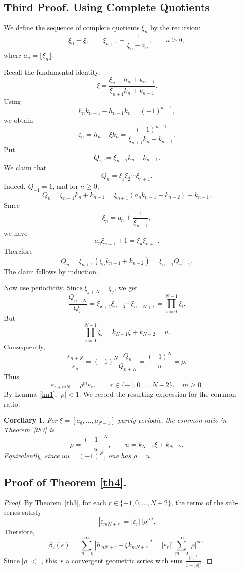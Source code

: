 \documentclass[]{interact}
\theoremstyle{plain}
\numberwithin{equation}{section} %
\newtheorem{corollary}[thm]{Corollary}
\numberwithin{table}{section} %
\numberwithin{figure}{section}
\begin{document}
\subsection{Third Proof. Using Complete Quotients}

We define the sequence of complete quotients $\xi_n$ by the recursion:
$$
\xi_0 = \xi, \qquad
\xi_{n+1} = \frac{1}{\xi_n - a_n}, \qquad n \ge 0,
$$
where $a_n = \lfloor \xi_n \rfloor$.

Recall the fundamental identity:
\[
\xi=\frac{\xi_{n+1}h_n+h_{n-1}}{\xi_{n+1}k_n+k_{n-1}}.
\]
Using
\[
h_nk_{n-1}-h_{n-1}k_n=(-1)^{n-1},
\]
we obtain
\[
\varepsilon_n
=
h_n-\xi k_n
=
\frac{(-1)^{n-1}}{\xi_{n+1}k_n+k_{n-1}}.
\]
Put
\[
Q_n:=\xi_{n+1}k_n+k_{n-1}.
\]
We claim that
\[
Q_n=\xi_1\xi_2\cdots \xi_{n+1}.
\]
Indeed, \(Q_{-1}=1\), and for \(n\ge0\),
\[
Q_n
=
\xi_{n+1}k_n+k_{n-1}
=
\xi_{n+1}(a_nk_{n-1}+k_{n-2})+k_{n-1}.
\]
Since
\[
\xi_n=a_n+\frac1{\xi_{n+1}},
\]
we have
\[
a_n\xi_{n+1}+1=\xi_n\xi_{n+1}.
\]
Therefore
\[
Q_n
=
\xi_{n+1}(\xi_nk_{n-1}+k_{n-2})
=
\xi_{n+1}Q_{n-1}.
\]
The claim follows by induction.

Now use periodicity. Since \(\xi_{j+N}=\xi_j\), we get
\[
\frac{Q_{n+N}}{Q_n}
=
\xi_{n+2}\xi_{n+3}\cdots \xi_{n+N+1}
=
\prod_{i=0}^{N-1}\xi_i.
\]
But
\[
\prod_{i=0}^{N-1}\xi_i
=
k_{N-1}\xi+k_{N-2}
=
u.
\]
Consequently,
\[
\frac{\varepsilon_{n+N}}{\varepsilon_n}
=
(-1)^N\frac{Q_n}{Q_{n+N}}
=
\frac{(-1)^N}{u}
=
\rho.
\]
Thus
\[
\varepsilon_{r+mN}=\rho^m\varepsilon_r,
\qquad r\in\{-1,0,\dots,N-2\},\quad m\ge0.
\]
By Lemma~\ref{lm1}, \(|\rho|<1\). We record the resulting expression for the
common ratio.  

\begin{corollary}
For \(\xi=[\overline{a_0,\dots,a_{N-1}}]\) purely periodic, the common ratio in
Theorem~\ref{th3} is
\[
\rho=\frac{(-1)^N}{u},
\qquad
u=k_{N-1}\xi+k_{N-2}.
\]
Equivalently, since \(u\bar u=(-1)^N\), one has \(\rho=\bar u\).
\end{corollary}




\subsection*{Proof of Theorem \ref{th4}.}
\begin{proof}
By Theorem~\ref{th3}, for each $r\in\{-1,0,\dots,N-2\}$, the terms of the sub-series satisfy \[
|\varepsilon_{mN+r}|=|\varepsilon_r|\,|\rho|^m. \]
Therefore,
$$
\beta_r(s)
=
\sum_{m=0}^\infty
|h_{mN+r} - \xi k_{mN+r}|^s
= |\varepsilon_r|^s \sum_{m=0}^\infty |\rho|^{sm}.
$$
Since $|\rho|<1$, this is a convergent geometric series with sum $\frac{|\varepsilon_r|^s}{1-|\rho|^s}$.
\end{proof}
\end{document}
